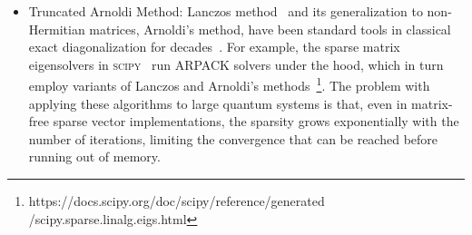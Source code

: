 \documentclass[
  reprint,            %
  amsmath,amssymb,
  aps,
  superscriptaddress, %
  longbibliography
]{revtex4-2}
\theoremstyle{definition}
\def\A{\mathcal{A}}
\def\E{\mathcal{E}}
\begin{document}
\begin{itemize}
    Fixing $D$ guarantees that the number of operations has a fixed ceiling. Likewise, fixing $R$ guarantees that the memory required has a fixed ceiling. The diagonal ranking algorithm requires the tuning of two hyperparameters. This algorithm is not guaranteed to produce a monotonically-decreasing estimation of the ground-state energy.

    \begin{algorithm}[H]
    \caption{Diagonal ranking}\label{alg:diag ranking}
    \begin{algorithmic}[1]
        \Require $D$ 
        \Require $R>D$ 
        \Require $T$ 
        \Require $B^0 = \{ x_1, ..., x_{N_0}\}$ 
        \State $\mathcal{R}^0 = B^0$ 
        \State $\mu \gets 0$ 
            \State  $\mathcal{A}^\mu = \{x_a \notin \mathcal{C}^\mu \; | \; \langle x_a | H | x_i \rangle \neq 0 \textrm{ for some } x_i \in B^\mu\}$ 
            \State $\mathcal{R}^{\mu+1} = \mathcal{R}^\mu \cup \A^\mu$ 
            \State $\E_{\mathcal{R}^{\mu+1}} = \{E_{x_b} = \langle x_b|H|x_b\rangle  \: | \: x_b \in \mathcal{R}^{\mu+1} \}$  
            \State $\sigma \gets$ permutation s.t. $E_{x_{\sigma(1)}}\le\hdots \le E_{x_{\sigma(|\mathcal{R}^{\mu+1}|)}}$ 
            \State $B^{\mu + 1} = \{x_{\sigma(1)}, ...,x_{\sigma(D))} \; | \; x_b \in \mathcal{R}^{\mu+1}  \}$ 
            \State $\mathcal{R}^{\mu+1} \gets  \{x_{\sigma(1)}, ...,x_{\sigma(R))} \; | \; x_b \in \mathcal{R}^{\mu+1}  \}$ 
            \State $\mu \gets \mu+1$ 
        \EndWhile
    \State \textbf{Return} $B^{\mu + 1}$
    \end{algorithmic}
    \end{algorithm}
    
    \item Truncated Arnoldi Method: Lanczos method~\cite{lanczos1950iteration} and its generalization to non-Hermitian matrices, Arnoldi's method, have been standard tools in classical exact diagonalization for decades~\cite{saad2011numerical}.
For example, the sparse matrix eigensolvers in \textsc{scipy}~\cite{virtanen2020scipy} run ARPACK solvers under the hood, which in turn employ variants of Lanczos and Arnoldi's methods~\footnote{https://docs.scipy.org/doc/scipy/reference/generated /scipy.sparse.linalg.eigs.html}.
The problem with applying these algorithms to large quantum systems is that, even in matrix-free sparse vector implementations, the sparsity grows exponentially with the number of iterations, limiting the convergence that can be reached before running out of memory.


\end{itemize}
\end{document}

